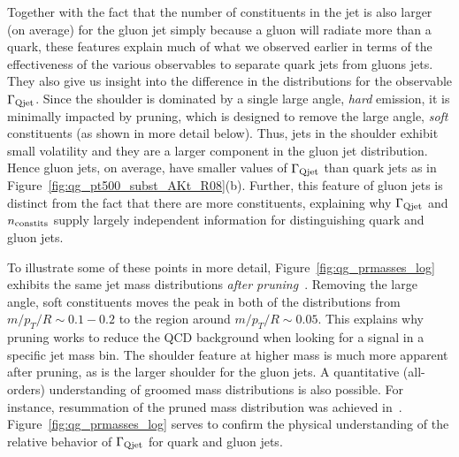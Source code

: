 
Together with  the fact that the number of constituents in the jet is also larger (on average) for the gluon jet simply because a gluon will radiate more than a quark, these features explain much of what we observed earlier in terms of the effectiveness of the various observables to separate quark jets from gluons jets. They also give us insight into the difference in the distributions for the observable 
$\Gamma_{\rm Qjet}$. Since the shoulder is dominated by a single large angle, \textit{hard} emission, it is minimally impacted by pruning,
which is designed to remove the large angle, \textit{soft} constituents (as shown in more detail below). Thus, jets in the shoulder exhibit small volatility and they are a larger
component in the gluon jet distribution.  Hence gluon jets, on average, have smaller values of  $\Gamma_{\rm Qjet}$ than quark jets as in 
Figure~\ref{fig:qg_pt500_subst_AKt_R08}(b).  Further, this feature of gluon jets is distinct from the fact that there are more constituents, explaining why
$\Gamma_{\rm Qjet}$ and $n_ {\rm constits}$ supply largely independent information for distinguishing quark and gluon jets. 

To illustrate some of these points in more detail, Figure~\ref{fig:qg_prmasses_log} exhibits the same jet mass distributions  
\textit{after pruning}~\cite{Ellis:2009me,Ellis:2009su}.  Removing the large angle,  soft constituents
moves the peak in both of the distributions from  $m/p_T/R \sim 0.1 - 0.2$ to the region around $m/p_T/R \sim 0.05$.  This explains why pruning works to reduce the
QCD background when looking for a signal in a specific jet mass bin.  The shoulder feature at higher mass is much more apparent after pruning, as is the larger shoulder for
the gluon jets.  A quantitative (all-orders) understanding of groomed mass distributions is also possible. For instance, resummation of the pruned mass distribution was achieved in~\cite{Dasgupta:2013ihk,Dasgupta:2013via}. Figure~\ref{fig:qg_prmasses_log} serves to confirm the physical understanding of the relative behavior of $\Gamma_{\rm Qjet}$ for quark and gluon jets.

